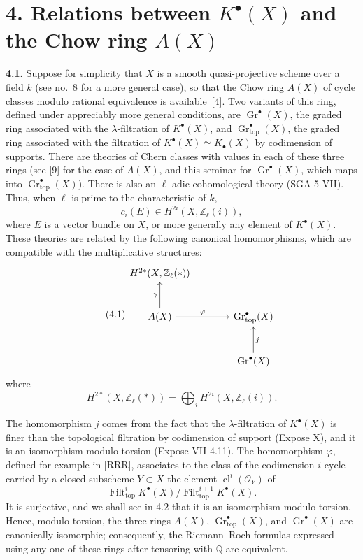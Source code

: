 \documentclass[11pt]{article}
\newcommand{\Q}{\mathbb Q}
\newcommand{\Zell}{\mathbb Z_{\ell}}
\newcommand{\Gtop}{\operatorname{Gr}_{\mathrm{top}}}
\newcommand{\Filt}{\operatorname{Filt}}
\newcommand{\cl}{\operatorname{cl}}
\begin{document}
\section*{4. Relations between $K^\bullet(X)$ and the Chow ring $A(X)$}

\noindent\textbf{4.1.}
Suppose for simplicity that $X$ is a smooth quasi-projective scheme over a
field $k$ (see no.~8 for a more general case), so that the Chow ring $A(X)$
of cycle classes modulo rational equivalence is available~[4]. Two variants
of this ring, defined under appreciably more general conditions, are
$\operatorname{Gr}^\bullet(X)$, the graded ring associated with the
$\lambda$-filtration of $K^\bullet(X)$, and $\Gtop^\bullet(X)$, the graded
ring associated with the filtration of
$K^\bullet(X)\simeq K_\bullet(X)$ by codimension of supports. There are
theories of Chern classes with values in each of these three rings (see [9]
for the case of $A(X)$, and this seminar for
$\operatorname{Gr}^\bullet(X)$, which maps into $\Gtop^\bullet(X)$). There is
also an $\ell$-adic cohomological theory (SGA 5 VII). Thus, when $\ell$ is
prime to the characteristic of $k$,
\[
 c_i(E)\in H^{2i}(X,\Zell(i)),
\]
where $E$ is a vector bundle on $X$, or more generally any element of
$K^\bullet(X)$. These theories are related by the following canonical
homomorphisms, which are compatible with the multiplicative structures:
\begin{equation*}\tag{4.1}
\begin{tikzcd}[column sep=large,row sep=large]
 H^{2*}(X,\Zell(*)) & {} \\
 A(X) \arrow[u,"\gamma"] \arrow[r,"\varphi"] & \Gtop^\bullet(X) \\
 {} & \operatorname{Gr}^\bullet(X) \arrow[u,"j"']
\end{tikzcd}
\end{equation*}
where
\[
 H^{2*}(X,\Zell(*))=\bigoplus_i H^{2i}(X,\Zell(i)).
\]

The homomorphism $j$ comes from the fact that the $\lambda$-filtration of
$K^\bullet(X)$ is finer than the topological filtration by codimension of
support (Expose X), and it is an isomorphism modulo torsion (Expose VII
4.11). The homomorphism $\varphi$, defined for example in [RRR], associates
to the class of the codimension-$i$ cycle carried by a closed subscheme
$Y\subset X$ the element $\cl^i(\mathcal O_Y)$ of
\[
 \Filt_{\mathrm{top}}^i K^\bullet(X)/
 \Filt_{\mathrm{top}}^{i+1}K^\bullet(X).
\]
It is surjective, and we shall see in 4.2 that it is an isomorphism modulo
torsion. Hence, modulo torsion, the three rings $A(X)$,
$\Gtop^\bullet(X)$, and $\operatorname{Gr}^\bullet(X)$ are canonically
isomorphic; consequently, the Riemann--Roch formulas expressed using any
one of these rings after tensoring with $\Q$ are equivalent.
\end{document}
